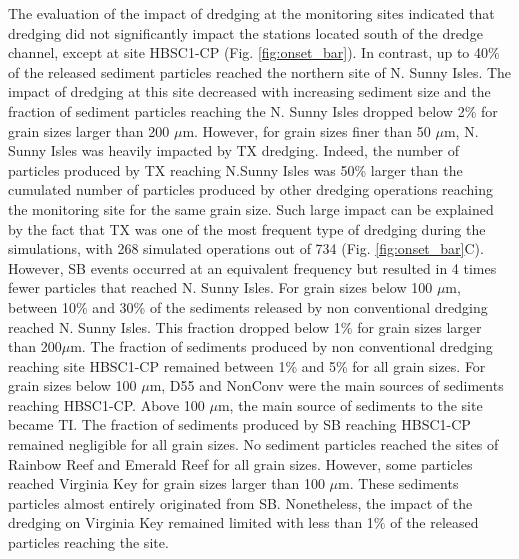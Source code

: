 The evaluation of the impact of dredging at the monitoring sites indicated that dredging did not significantly impact the stations located south of the dredge channel, except at site HBSC1-CP (Fig. \ref{fig:onset_bar}). In contrast, up to 40\% of the released sediment particles reached the northern site of N. Sunny Isles. The impact of dredging at this site decreased with increasing sediment size and the fraction of sediment particles reaching the N. Sunny Isles dropped below 2\% for grain sizes larger than 200 $\mu$m. However, for grain sizes finer than 50 $\mu$m, N. Sunny Isles was heavily impacted by TX dredging. Indeed, the number of particles produced by TX reaching N.Sunny Isles was 50\% larger than the cumulated number of particles produced by other dredging operations reaching the monitoring site for the same grain size. Such large impact can be explained by the fact that TX was one of the most frequent type of dredging during the simulations, with 268 simulated operations out of 734 (Fig. \ref{fig:onset_bar}C). However, SB events occurred at an equivalent frequency but resulted in 4 times fewer particles that reached N. Sunny Isles. For grain sizes below 100 $\mu$m, between 10\% and 30\% of the sediments released by non conventional dredging reached N. Sunny Isles. This fraction dropped below  1\% for grain sizes larger than 200$\mu$m. The fraction of sediments produced by non conventional dredging reaching site HBSC1-CP remained between 1\% and 5\% for all grain sizes. For grain sizes below 100 $\mu$m, D55 and NonConv were the main sources of sediments reaching HBSC1-CP. Above 100 $\mu$m, the main source of sediments to the site became TI. The fraction of sediments produced by SB reaching HBSC1-CP remained negligible for all grain sizes. No sediment particles reached the sites of Rainbow Reef and Emerald Reef for all grain sizes. However, some particles reached Virginia Key for grain sizes larger than 100 $\mu$m. These sediments particles almost entirely originated from SB. Nonetheless, the impact of the dredging on Virginia Key remained limited with less than 1$\%$ of the released particles reaching the site.

